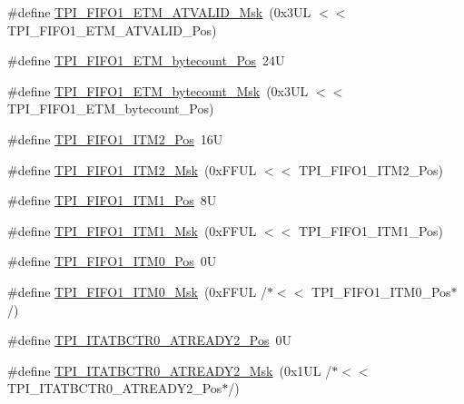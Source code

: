 \begin{DoxyCompactItemize}
\item 
\#define \mbox{\hyperlink{group___c_m_s_i_s___t_p_i_ga0e8f29a1e9378d1ceb0708035edbb86d}{T\+P\+I\+\_\+\+F\+I\+F\+O1\+\_\+\+E\+T\+M\+\_\+\+A\+T\+V\+A\+L\+I\+D\+\_\+\+Msk}}~(0x3\+U\+L $<$$<$ T\+P\+I\+\_\+\+F\+I\+F\+O1\+\_\+\+E\+T\+M\+\_\+\+A\+T\+V\+A\+L\+I\+D\+\_\+\+Pos)
\item 
\#define \mbox{\hyperlink{group___c_m_s_i_s___t_p_i_gaab31238152b5691af633a7475eaf1f06}{T\+P\+I\+\_\+\+F\+I\+F\+O1\+\_\+\+E\+T\+M\+\_\+bytecount\+\_\+\+Pos}}~24U
\item 
\#define \mbox{\hyperlink{group___c_m_s_i_s___t_p_i_gab554305459953b80554fdb1908b73291}{T\+P\+I\+\_\+\+F\+I\+F\+O1\+\_\+\+E\+T\+M\+\_\+bytecount\+\_\+\+Msk}}~(0x3\+U\+L $<$$<$ T\+P\+I\+\_\+\+F\+I\+F\+O1\+\_\+\+E\+T\+M\+\_\+bytecount\+\_\+\+Pos)
\item 
\#define \mbox{\hyperlink{group___c_m_s_i_s___t_p_i_ga1828c228f3940005f48fb8dd88ada35b}{T\+P\+I\+\_\+\+F\+I\+F\+O1\+\_\+\+I\+T\+M2\+\_\+\+Pos}}~16U
\item 
\#define \mbox{\hyperlink{group___c_m_s_i_s___t_p_i_gae54512f926ebc00f2e056232aa21d335}{T\+P\+I\+\_\+\+F\+I\+F\+O1\+\_\+\+I\+T\+M2\+\_\+\+Msk}}~(0x\+F\+F\+U\+L $<$$<$ T\+P\+I\+\_\+\+F\+I\+F\+O1\+\_\+\+I\+T\+M2\+\_\+\+Pos)
\item 
\#define \mbox{\hyperlink{group___c_m_s_i_s___t_p_i_gaece86ab513bc3d0e0a9dbd82258af49f}{T\+P\+I\+\_\+\+F\+I\+F\+O1\+\_\+\+I\+T\+M1\+\_\+\+Pos}}~8U
\item 
\#define \mbox{\hyperlink{group___c_m_s_i_s___t_p_i_ga3347f42828920dfe56e3130ad319a9e6}{T\+P\+I\+\_\+\+F\+I\+F\+O1\+\_\+\+I\+T\+M1\+\_\+\+Msk}}~(0x\+F\+F\+U\+L $<$$<$ T\+P\+I\+\_\+\+F\+I\+F\+O1\+\_\+\+I\+T\+M1\+\_\+\+Pos)
\item 
\#define \mbox{\hyperlink{group___c_m_s_i_s___t_p_i_ga2188671488417a52abb075bcd4d73440}{T\+P\+I\+\_\+\+F\+I\+F\+O1\+\_\+\+I\+T\+M0\+\_\+\+Pos}}~0U
\item 
\#define \mbox{\hyperlink{group___c_m_s_i_s___t_p_i_ga8ae09f544fc1a428797e2a150f14a4c9}{T\+P\+I\+\_\+\+F\+I\+F\+O1\+\_\+\+I\+T\+M0\+\_\+\+Msk}}~(0x\+F\+F\+U\+L /$\ast$$<$$<$ T\+P\+I\+\_\+\+F\+I\+F\+O1\+\_\+\+I\+T\+M0\+\_\+\+Pos$\ast$/)
\item 
\#define \mbox{\hyperlink{group___c_m_s_i_s___t_p_i_ga3f0249dfcfd58090c08fd4a0adea6b22}{T\+P\+I\+\_\+\+I\+T\+A\+T\+B\+C\+T\+R0\+\_\+\+A\+T\+R\+E\+A\+D\+Y2\+\_\+\+Pos}}~0U
\item 
\#define \mbox{\hyperlink{group___c_m_s_i_s___t_p_i_gaf985067de6e6e68fbbd2350646b9125e}{T\+P\+I\+\_\+\+I\+T\+A\+T\+B\+C\+T\+R0\+\_\+\+A\+T\+R\+E\+A\+D\+Y2\+\_\+\+Msk}}~(0x1\+U\+L /$\ast$$<$$<$ T\+P\+I\+\_\+\+I\+T\+A\+T\+B\+C\+T\+R0\+\_\+\+A\+T\+R\+E\+A\+D\+Y2\+\_\+\+Pos$\ast$/)

\end{DoxyCompactItemize}
